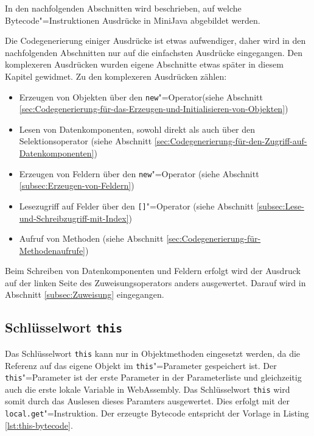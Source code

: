 In den nachfolgenden Abschnitten wird beschrieben, auf welche Bytecode"=Instruktionen Ausdrücke in MiniJava abgebildet werden.

Die Codegenerierung einiger Ausdrücke ist etwas aufwendiger, daher wird in den nachfolgenden Abschnitten nur auf die einfachsten Ausdrücke eingegangen. Den komplexeren Ausdrücken wurden eigene Abschnitte etwas später in diesem Kapitel gewidmet. Zu den komplexeren Ausdrücken zählen: 
\begin{itemize}
    \item Erzeugen von Objekten über den \lstinline{new}"=Operator(siehe Abschnitt \ref{sec:Codegenerierung-für-das-Erzeugen-und-Initialisieren-von-Objekten})
    \item Lesen von Datenkomponenten, sowohl direkt als auch über den Selektionsoperator (siehe Abschnitt \ref{sec:Codegenerierung-für-den-Zugriff-auf-Datenkomponenten})
    \item Erzeugen von Feldern über den \lstinline{new}"=Operator (siehe Abschnitt \ref{subsec:Erzeugen-von-Feldern})
    \item Lesezugriff auf Felder über den \lstinline{[]}"=Operator (siehe Abschnitt \ref{subsec:Lese-und-Schreibzugriff-mit-Index})
    \item Aufruf von Methoden (siehe Abschnitt \ref{sec:Codegenerierung-für-Methodenaufrufe})
\end{itemize}

Beim Schreiben von Datenkomponenten und Feldern erfolgt wird der Ausdruck auf der linken Seite des Zuweisungsoperators anders ausgewertet. Darauf wird in Abschnitt \ref{subsec:Zuweisung} eingegangen.

\pagebreak
\subsection{Schlüsselwort \lstinline{this}}

Das Schlüsselwort \lstinline{this} kann nur in Objektmethoden eingesetzt werden, da die Referenz auf das eigene Objekt im \lstinline{this}"=Parameter gespeichert ist. Der \lstinline{this}"=Parameter ist der erste Parameter in der Parameterliste und gleichzeitig auch die erste lokale Variable in WebAssembly. Das Schlüsselwort \lstinline{this} wird somit durch das Auslesen dieses Paramters ausgewertet. Dies erfolgt mit der \lstinline{local.get}"=Instruktion. Der erzeugte Bytecode entspricht der Vorlage in Listing \ref{lst:this-bytecode}.



